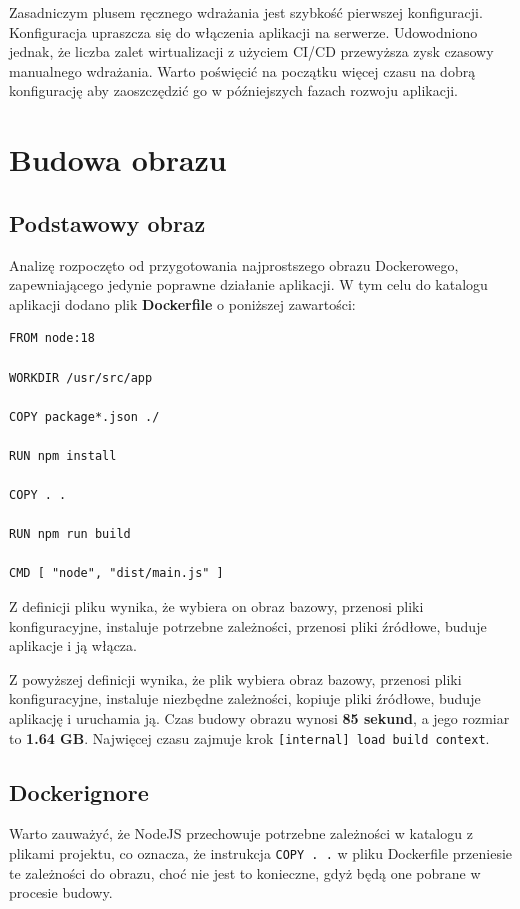 \documentclass{article}
\begin{document}
Zasadniczym plusem ręcznego wdrażania jest szybkość pierwszej konfiguracji. Konfiguracja upraszcza się do włączenia aplikacji na serwerze. Udowodniono jednak, że liczba zalet wirtualizacji z użyciem CI/CD przewyższa zysk czasowy manualnego wdrażania. Warto poświęcić na początku więcej czasu na dobrą konfigurację aby zaoszczędzić go w późniejszych fazach rozwoju aplikacji.


\section{Budowa obrazu} \label{sectionBudowaObrazu}

\subsection{Podstawowy obraz}

Analizę rozpoczęto od przygotowania najprostszego obrazu Dockerowego, zapewniającego jedynie poprawne działanie aplikacji. W tym celu do katalogu aplikacji dodano plik \textbf{Dockerfile} o poniższej zawartości:

\begin{lstlisting}[caption=Podstawowy plik Dockerfile]
FROM node:18

WORKDIR /usr/src/app

COPY package*.json ./

RUN npm install

COPY . .

RUN npm run build

CMD [ "node", "dist/main.js" ]
\end{lstlisting}

Z definicji pliku wynika, że wybiera on obraz bazowy, przenosi pliki konfiguracyjne, instaluje potrzebne zależności, przenosi pliki źródłowe, buduje aplikacje i ją włącza.

Z powyższej definicji wynika, że plik wybiera obraz bazowy, przenosi pliki konfiguracyjne, instaluje niezbędne zależności, kopiuje pliki źródłowe, buduje aplikację i uruchamia ją. Czas budowy obrazu wynosi \textbf{85 sekund}, a jego rozmiar to \textbf{1.64 GB}. Najwięcej czasu zajmuje krok \lstinline|[internal] load build context|.

\subsection{Dockerignore}

Warto zauważyć, że NodeJS przechowuje potrzebne zależności w katalogu z plikami projektu, co oznacza, że instrukcja \lstinline|COPY . .| w pliku Dockerfile przeniesie te zależności do obrazu, choć nie jest to konieczne, gdyż będą one pobrane w procesie budowy.
\end{document}
